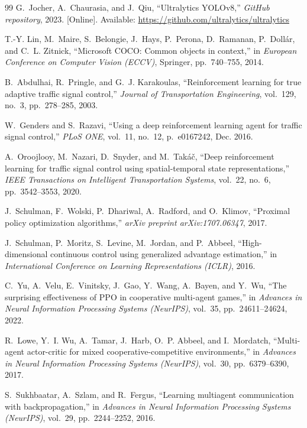 \begin{small}
\begin{thebibliography}{99}
G.~Jocher, A.~Chaurasia, and J.~Qiu, ``Ultralytics YOLOv8,'' \emph{GitHub repository}, 2023. [Online]. Available: \url{https://github.com/ultralytics/ultralytics}

T.-Y. Lin, M.~Maire, S.~Belongie, J.~Hays, P.~Perona, D.~Ramanan, P.~Doll{\'a}r, and C.~L. Zitnick, ``Microsoft COCO: Common objects in context,'' in \emph{European Conference on Computer Vision (ECCV)}, Springer, pp.~740--755, 2014.

B.~Abdulhai, R.~Pringle, and G.~J. Karakoulas, ``Reinforcement learning for true adaptive traffic signal control,'' \emph{Journal of Transportation Engineering}, vol.~129, no.~3, pp.~278--285, 2003.

W.~Genders and S.~Razavi, ``Using a deep reinforcement learning agent for traffic signal control,'' \emph{PLoS ONE}, vol.~11, no.~12, p.~e0167242, Dec. 2016.

A.~Oroojlooy, M.~Nazari, D.~Snyder, and M.~Tak{\'a}{\v{c}}, ``Deep reinforcement learning for traffic signal control using spatial-temporal state representations,'' \emph{IEEE Transactions on Intelligent Transportation Systems}, vol.~22, no.~6, pp.~3542--3553, 2020.

J.~Schulman, F.~Wolski, P.~Dhariwal, A.~Radford, and O.~Klimov, ``Proximal policy optimization algorithms,'' \emph{arXiv preprint arXiv:1707.06347}, 2017.

J.~Schulman, P.~Moritz, S.~Levine, M.~Jordan, and P.~Abbeel, ``High-dimensional continuous control using generalized advantage estimation,'' in \emph{International Conference on Learning Representations (ICLR)}, 2016.

C.~Yu, A.~Velu, E.~Vinitsky, J.~Gao, Y.~Wang, A.~Bayen, and Y.~Wu, ``The surprising effectiveness of PPO in cooperative multi-agent games,'' in \emph{Advances in Neural Information Processing Systems (NeurIPS)}, vol.~35, pp.~24611--24624, 2022.

R.~Lowe, Y.~I. Wu, A.~Tamar, J.~Harb, O.~P. Abbeel, and I.~Mordatch, ``Multi-agent actor-critic for mixed cooperative-competitive environments,'' in \emph{Advances in Neural Information Processing Systems (NeurIPS)}, vol.~30, pp.~6379--6390, 2017.

S.~Sukhbaatar, A.~Szlam, and R.~Fergus, ``Learning multiagent communication with backpropagation,'' in \emph{Advances in Neural Information Processing Systems (NeurIPS)}, vol.~29, pp.~2244--2252, 2016.


\end{thebibliography}
\end{small}
